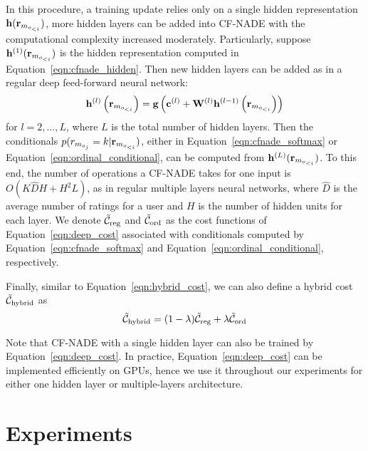 \documentclass{article}
\newcommand{\cfnade}{CF-NADE\xspace}
\newcommand{\cost}{\mathcal{C}}
\begin{document}
In this procedure, a training update relies only on a single hidden
representation $\mathbf{h}( {\bf r}_{m_{o_{<i}}} )$, more hidden
layers can be added into \cfnade with the
computational complexity increased moderately. Particularly, suppose
$\mathbf{h}^{(1)} ( {\bf r}_{m_{o_{<i}}} )$ is the hidden
representation computed in Equation~\ref{eqn:cfnade_hidden}. Then new hidden layers can be
added as in a regular deep feed-forward neural network:
\begin{equation}
    \mathbf{h}^{(l)}\left ( {\bf r}_{m_{o_{<i}}} \right ) = {\bf g}\left({\bf c}^{(l)} + {\bf W}^{(l)}{\bf h}^{(l-1)}\left( {\bf r}_{m_{o_{<i}}}  \right)\right)
    \label{eqn:deep_cfnade_hidden}
\end{equation}
for $l = 2,\ldots,L$, where $L$ is the total number of hidden
layers. Then the conditionals
$p( r_{m_{o_j}}=k|{\bf r}_{m_{o_{<i}}} )$, either in
Equation~\ref{eqn:cfnade_softmax} or
Equation~\ref{eqn:ordinal_conditional}, can be computed from
$\mathbf{h}^{(L)} ( {\bf r}_{m_{o_{<i}}} )$. To this end, the number of
operations a \cfnade takes for one input is $O(K\hat{D}H+H^2L)$, as
in regular multiple layers neural networks, where $\hat{D}$ is the
average number of ratings for a user and $H$ is the number of hidden
units for each layer.  We denote $\tilde{\cost}_{\textup{reg}}$ and
$\tilde{\cost}_{\textup{ord}}$ as the cost functions of
Equation~\ref{eqn:deep_cost} associated with conditionals computed by
Equation~\ref{eqn:cfnade_softmax} and
Equation~\ref{eqn:ordinal_conditional}, respectively.

Finally, similar to Equation~\ref{eqn:hybrid_cost}, we can also define a hybrid cost $\tilde{\cost}_{\textup{hybrid}}$ as 
\begin{equation}
\tilde{\cost}_{\textup{hybrid}} = (1-\lambda)\tilde{\cost}_{\textup{reg}} + \lambda\tilde{\cost}_{\textup{ord}}
\label{eqn:deep_hybrid}
\end{equation}

Note that \cfnade with a single hidden layer can also be trained by
Equation~\ref{eqn:deep_cost}. In practice,
Equation~\ref{eqn:deep_cost} can be implemented efficiently on GPUs,
hence we use it throughout our experiments for either one hidden layer
or multiple-layers architecture.







\section{Experiments}
\label{sec:experiments}
\end{document}
